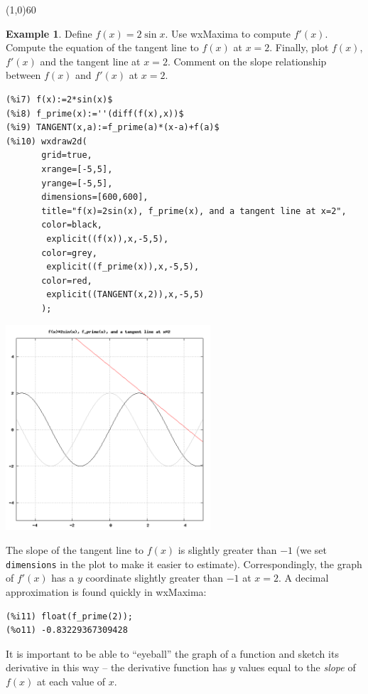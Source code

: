 \documentclass[10.5pt,twoside]{report}
\theoremstyle{definition}
\newtheorem{exmp}{Example}[section]
\begin{document}
\line(1,0){60}
\linethickness{0.5mm}



\begin{exmp} Define $f(x)=2\sin{x}$.  Use wxMaxima to compute $f'(x)$.  Compute the equation of the tangent line to $f(x)$ at $x=2$.  Finally, plot $f(x)$, $f'(x)$ and the tangent line at $x=2$.  Comment on the slope relationship between $f(x)$ and $f'(x)$ at $x=2$.\\

\begin{verbatim}
(%i7) f(x):=2*sin(x)$
(%i8) f_prime(x):=''(diff(f(x),x))$
(%i9) TANGENT(x,a):=f_prime(a)*(x-a)+f(a)$
(%i10) wxdraw2d(
       grid=true,
       xrange=[-5,5],
       yrange=[-5,5],
       dimensions=[600,600],
       title="f(x)=2sin(x), f_prime(x), and a tangent line at x=2",
       color=black,
        explicit((f(x)),x,-5,5),
       color=grey,
        explicit((f_prime(x)),x,-5,5),
       color=red,
        explicit((TANGENT(x,2)),x,-5,5)
       );
\end{verbatim}

\includegraphics[width=3in]{example_4_2_2}

The slope of the tangent line to $f(x)$ is slightly greater than $-1$ (we set \verb|dimensions| in the plot to make it easier to estimate).  Correspondingly, the graph of $f'(x)$ has a $y$ coordinate slightly greater than $-1$ at $x=2$.  A decimal approximation is found quickly in wxMaxima:

\begin{verbatim}
(%i11) float(f_prime(2));
(%o11) -0.83229367309428
\end{verbatim}

It is important to be able to ``eyeball'' the graph of a function and sketch its derivative in this way -- the derivative function has $y$ values equal to the \textit{slope} of $f(x)$ at each value of $x$.

\end{exmp}
\end{document}
